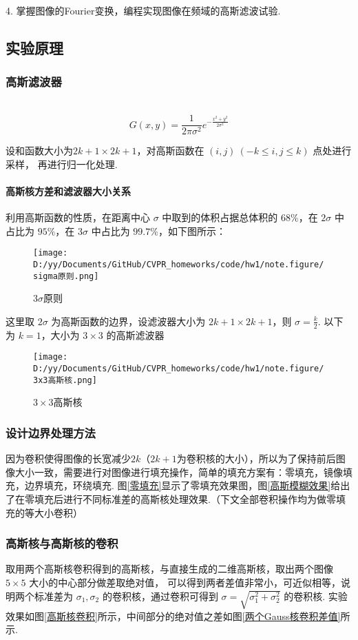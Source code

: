 \documentclass[12pt, a4paper, oneside]{ctexart}
\begin{document}
4. 掌握图像的Fourier变换，编程实现图像在频域的高斯滤波试验.
\subsection{实验原理}
\subsubsection{高斯滤波器}\ \vspace{-0.5cm}
\[G(x, y) = \frac{1}{2\pi\sigma^2}e^{-\frac{x^2+y^2}{2\sigma^2}}\]

设和函数大小为$2k+1\times 2k+1$，对高斯函数在 \((i,j)\ (-k\leqslant i,j\leqslant k)\) 点处进行采样，
再进行归一化处理.

\paragraph{高斯核方差和滤波器大小关系}

利用高斯函数的性质，在距离中心 \(\sigma\) 中取到的体积占据总体积的
\(68\%\)，在 \(2\sigma\) 中占比为 \(95\%\)，在 \(3\sigma\) 中占比为
\(99.7\%\)，如下图所示：

\begin{figure}[htbp]
    \centering
    \texttt{[image: D:/yy/Documents/GitHub/CVPR\_homeworks/code/hw1/note.figure/sigma原则.png]}
    \caption{$3\sigma$原则}
\end{figure}

这里取 \(2\sigma\) 为高斯函数的边界，设滤波器大小为
\(2k+1\times 2k+1\)，则 \(\sigma = \frac{k}{2}\). 以下为 \(k=1\)，大小为
\(3\times 3\) 的高斯滤波器

\begin{figure}[htbp]
    \centering
    \texttt{[image: D:/yy/Documents/GitHub/CVPR\_homeworks/code/hw1/note.figure/3x3高斯核.png]}
    \caption{$3 \times 3$高斯核}
\end{figure}
\subsubsection{设计边界处理方法}
因为卷积使得图像的长宽减少$2k$（$2k+1$为卷积核的大小），所以为了保持前后图像大小一致，需要进行对图像进行填充操作，简单的填充方案有：零填充，镜像填充，边界填充，环绕填充. 图\ref{零填充}显示了零填充效果图，图\ref{高斯模糊效果}给出了在零填充后进行不同标准差的高斯核处理效果.（下文全部卷积操作均为做零填充的等大小卷积）
\subsubsection{高斯核与高斯核的卷积}
取用两个高斯核卷积得到的高斯核，与直接生成的二维高斯核，取出两个图像 \(5\times 5\) 大小的中心部分做差取绝对值，
可以得到两者差值非常小，可近似相等，说明两个标准差为
\(\sigma_1,\sigma_2\) 的卷积核，通过卷积可得到
\(\sigma = \sqrt{\sigma_1^2+\sigma_2^2}\) 的卷积核. 实验效果如图\ref{高斯核卷积}所示，中间部分的绝对值之差如图\ref{两个Gauss核卷积差值}所示.
\end{document}
